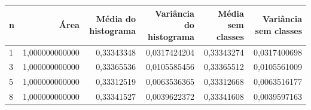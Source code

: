 \begin{tabular}{lrrrrr}
\toprule
n & Área & Média do histograma & Variância do histograma & Média sem classes & Variância sem classes \\
\midrule
1 & 1,000000000000 & 0,33343348 & 0,0317424204 & 0,33343274 & 0,0317400698 \\
3 & 1,000000000000 & 0,33365536 & 0,0105585456 & 0,33365512 & 0,0105561009 \\
5 & 1,000000000000 & 0,33312519 & 0,0063536365 & 0,33312668 & 0,0063516177 \\
8 & 1,000000000000 & 0,33341527 & 0,0039622372 & 0,33341608 & 0,0039597163 \\
\bottomrule
\end{tabular}
